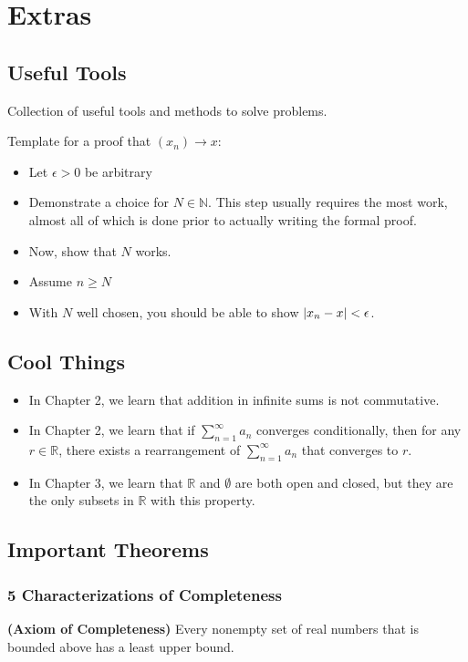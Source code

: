 \appendix
\chapter{Extras}
\section{Useful Tools}

Collection of useful tools and methods to solve problems.

\begin{tip}
  Template for a proof that $(x_n) \rightarrow x$:
  \begin{itemize}
    \item Let $\epsilon > 0$ be arbitrary 
    \item Demonstrate a choice for $N \in \mathbb{N}$. 
    This step usually requires the most work, almost all of
    which is done prior to actually writing the formal proof.
    \item Now, show that $N$ works.
    \item Assume $n \geq N$
    \item With $N$ well chosen,  you should be able to show $\abs{x_n - x} < \epsilon$.
  \end{itemize}
\end{tip}

\section{Cool Things}
\begin{itemize}
  \item In Chapter 2, we learn that addition in infinite sums is not commutative.
  \item In Chapter 2, we learn that if $\sum_{n=1}^\infty a_n$ converges conditionally, then 
  for any $r \in \mathbb{R}$, there exists a rearrangement of $\sum_{n=1}^\infty a_n$ that converges to $r$.
  \item In Chapter 3, we learn that $\mathbb{R}$ and $\emptyset$ are both open and closed, 
  but they are the only subsets in $\mathbb{R}$ with this property.
\end{itemize}

\section{Important Theorems}
\subsection{5 Characterizations of Completeness}
\begin{theorem}
  \textbf{\textup{(Axiom of Completeness)}}
  Every nonempty set of real numbers that is bounded above has a least upper bound. 
\end{theorem}

